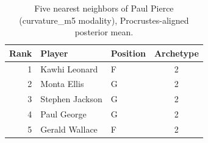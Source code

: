 \begin{table}[htbp]
  \centering\small
  \begin{tabular}{rllc}
    \toprule
    Rank & Player & Position & Archetype \\
    \midrule
    1 & Kawhi Leonard & F & 2 \\
    2 & Monta Ellis & G & 2 \\
    3 & Stephen Jackson & G & 2 \\
    4 & Paul George & G & 2 \\
    5 & Gerald Wallace & F & 2 \\
    \bottomrule
  \end{tabular}
  \caption{Five nearest neighbors of Paul Pierce (curvature_m5 modality), Procrustes-aligned posterior mean.}
  \label{tab:Paul_Pierce_neighbors_curvature_m5}
\end{table}

